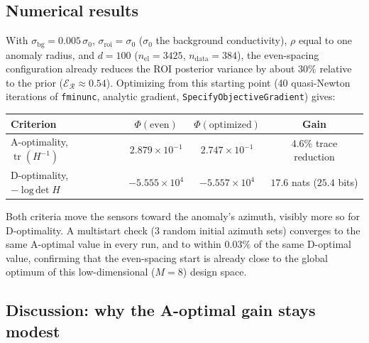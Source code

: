 \documentclass[11pt,a4paper]{article}
\newcommand{\tr}{\operatorname{tr}}
\newcommand{\logdet}{\operatorname{log\,det}}
\newcommand{\code}[1]{\texttt{#1}}
\begin{document}
\subsection{Numerical results}

With $\sigma_{\mathrm{bg}} = 0.005\,\sigma_0$, $\sigma_{\mathrm{roi}} = \sigma_0$
($\sigma_0$ the background conductivity), $\rho$ equal to one anomaly radius, and $d = 100$
($n_{\mathrm{el}} = 3425$, $n_{\mathrm{data}} = 384$), the even-spacing configuration already
reduces the ROI posterior variance by about $30\%$ relative to the prior
($\mathcal E_{\mathcal R} \approx 0.54$). Optimizing from this starting point (40 quasi-Newton
iterations of \code{fminunc}, analytic gradient, \code{SpecifyObjectiveGradient}) gives:
\begin{center}
\begin{tabular}{lccc}
\hline
Criterion & $\Phi(\text{even})$ & $\Phi(\text{optimized})$ & Gain \\
\hline
A-optimality, $\tr(H^{-1})$ & $2.879 \times 10^{-1}$ & $2.747 \times 10^{-1}$ & $4.6\%$ trace reduction \\
D-optimality, $-\logdet H$ & $-5.555 \times 10^{4}$ & $-5.557 \times 10^{4}$ & $17.6$ nats ($25.4$ bits) \\
\hline
\end{tabular}
\end{center}
Both criteria move the sensors toward the anomaly's azimuth, visibly more so for D-optimality. A
multistart check (3 random initial azimuth sets) converges to the same A-optimal value in every
run, and to within $0.03\%$ of the same D-optimal value, confirming that the even-spacing start is
already close to the global optimum of this low-dimensional ($M=8$) design space.

\subsection{Discussion: why the A-optimal gain stays modest}
\end{document}
